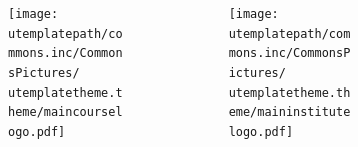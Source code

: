 \institute[\uinstituteshort]{{\uinstitute \\ \uchaire}}


\date[\uversion]{\tiny{Publication \INFODistrib ~du \\ \DTMnow}}



%
%





\begin{frame}[plain]
 					\begin{figure}
  					 \centering
  					 \begin{columns}[c]
  \begin{column}{0.4\textwidth}
  
    \begin{figure}
        \begin{flushleft}
  			\texttt{[image: \\utemplatepath/commons.inc/CommonsPictures/\\utemplatetheme.theme/maincourselogo.pdf]}
  \end{flushleft}
  \end{figure}
      \end{column}
  
  \begin{column}{0.6\textwidth}
    \begin{figure}
        \begin{flushright}
 		    \texttt{[image: \\utemplatepath/commons.inc/CommonsPictures/\\utemplatetheme.theme/maininstitutelogo.pdf]}
    \end{flushright}
  \end{figure}
  \end{column}
\end{columns}
   							  
   							  \end{figure}
							
				  				\titlepage
\end{frame}


